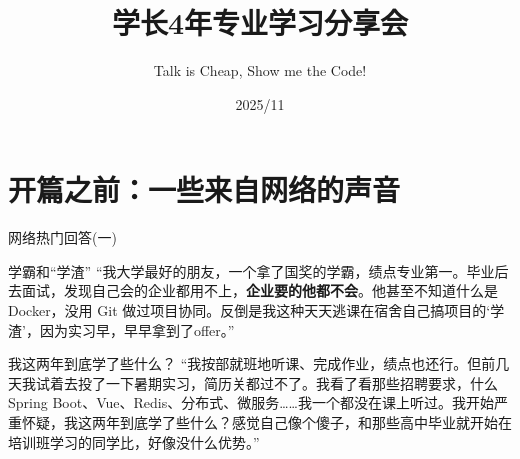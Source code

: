 \documentclass{beamer}
\title{学长4年专业学习分享会}
\subtitle{Talk is Cheap, Show me the Code!}
\date{2025/11}
\newcommand{\hrefcol}[2]{\textcolor{cyan}{\href{#1}{#2}}}
\begin{document}
\maketitle












\section*{开篇之前：一些来自网络的声音}

\begin{frame}{网络热门回答(一)}
    \begin{block}{学霸和“学渣”}
    “我大学最好的朋友，一个拿了国奖的学霸，绩点专业第一。毕业后去面试，发现自己会的企业都用不上，\textbf{企业要的他都不会}。他甚至不知道什么是 Docker，没用 Git 做过项目协同。反倒是我这种天天逃课在宿舍自己搞项目的‘学渣’，因为实习早，早早拿到了offer。”
    \end{block}
    \begin{block}{我这两年到底学了些什么？}
    “我按部就班地听课、完成作业，绩点也还行。但前几天我试着去投了一下暑期实习，简历关都过不了。我看了看那些招聘要求，什么Spring Boot、Vue、Redis、分布式、微服务……我一个都没在课上听过。我开始严重怀疑，我这两年到底学了些什么？感觉自己像个傻子，和那些高中毕业就开始在培训班学习的同学比，好像没什么优势。”
    \end{block}
\end{frame}
\end{document}
